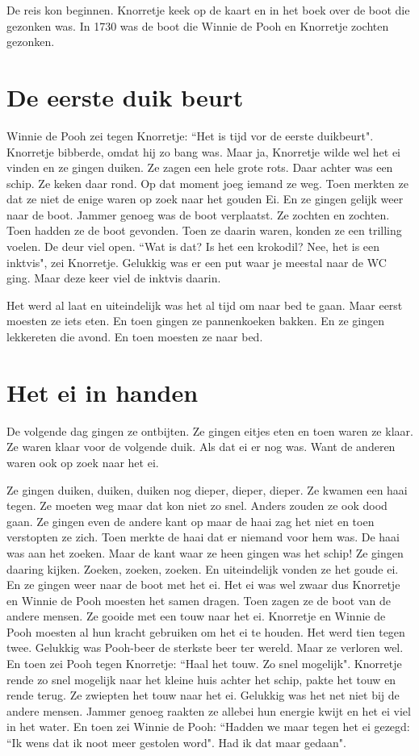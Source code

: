 \documentclass{article}
\begin{document}
De reis kon beginnen. Knorretje keek op de kaart en in het boek over de boot die gezonken was. In 1730 was de boot die Winnie de Pooh en Knorretje zochten gezonken.

\section{De eerste duik beurt}

Winnie de Pooh zei tegen Knorretje: ``Het is tijd vor de eerste duikbeurt". Knorretje bibberde, omdat hij zo bang was. Maar ja, Knorretje wilde wel het ei vinden en ze gingen duiken. Ze zagen een hele grote rots. Daar achter was een schip. Ze keken daar rond. Op dat moment joeg iemand ze weg. Toen merkten ze dat ze niet de enige waren op zoek naar het gouden Ei. En ze gingen gelijk weer naar de boot. Jammer genoeg was de boot verplaatst. Ze zochten en zochten. Toen hadden ze de boot gevonden. Toen ze daarin waren, konden ze een trilling voelen. De deur viel open. ``Wat is dat? Is het een krokodil? Nee, het is een inktvis", zei Knorretje. Gelukkig was er een put waar je meestal naar de WC ging. Maar deze keer viel de inktvis daarin.

Het werd al laat en uiteindelijk was het al tijd om naar bed te gaan. Maar eerst moesten ze iets eten. En toen gingen ze pannenkoeken bakken. En ze gingen lekkereten die avond. En toen moesten ze naar bed.

\section{Het ei in handen}

De volgende dag gingen ze ontbijten. Ze gingen eitjes eten en toen waren ze klaar. Ze waren klaar voor de volgende duik. Als dat ei er nog was. Want de anderen waren ook op zoek naar het ei.

Ze gingen duiken, duiken, duiken nog dieper, dieper, dieper. Ze kwamen een haai tegen. Ze moeten weg maar dat kon niet zo snel. Anders zouden ze ook dood gaan. Ze gingen even de andere kant op maar de haai zag het niet en toen verstopten ze zich. Toen merkte de haai dat er niemand voor hem was. De haai was aan het zoeken. Maar de kant waar ze heen gingen was het schip! Ze gingen daaring kijken. Zoeken, zoeken, zoeken. En uiteindelijk vonden ze het goude ei. En ze gingen weer naar de boot met het ei. Het ei was wel zwaar dus Knorretje en Winnie de Pooh moesten het samen dragen. Toen zagen ze de boot van de andere mensen. Ze gooide met een touw naar het ei. Knorretje en Winnie de Pooh moesten al hun kracht gebruiken om het ei te houden. Het werd tien tegen twee. Gelukkig was Pooh-beer de sterkste beer ter wereld. Maar ze verloren wel. En toen zei Pooh tegen Knorretje: ``Haal het touw. Zo snel mogelijk". Knorretje rende zo snel mogelijk naar het kleine huis achter het schip, pakte het touw en rende terug. Ze zwiepten het touw naar het ei. Gelukkig was het net niet bij de andere mensen. Jammer genoeg raakten ze allebei hun energie kwijt en het ei viel in het water. En toen zei Winnie de Pooh: ``Hadden we maar tegen het ei gezegd: ``Ik wens dat ik noot meer gestolen word". Had ik dat maar gedaan".
\end{document}
